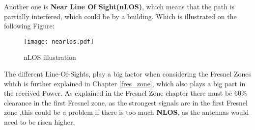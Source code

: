 Another one is \textbf{Near Line Of Sight(nLOS)}, which means that the path is partially interfered,  which could be by a building. Which is illustrated on the following Figure:

\begin{figure}[H]
\centering
\texttt{[image: nearlos.pdf]}
\caption{nLOS illustration}
\label{nLOS}
\end{figure} 


The different Line-Of-Sights, play a big factor when considering the Fresnel Zones which is further explained in Chapter \ref{fres_zone}, which also plays a big part in the received Power. As explained in the Fresnel Zone chapter there must be $60\%$ clearance in the first Fresnel zone, as the strongest signals are in the first Fresnel zone ,this could be a problem if there is too much \textbf{NLOS}, as the antennas would need to be risen higher.       

















